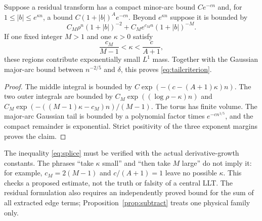 \begin{lemma}\label{lem:splice}
Suppose a residual transform has a compact minor-arc bound $Ce^{-cn}$ and, for $1\le|b|\le e^{\kappa n}$, a bound $C(1+|b|)^A e^{-cn}$. Beyond $e^{\kappa n}$ suppose it is bounded by
\[
 C_M\rho^n(1+|b|)^{-2}+C_Me^{c_M n}(1+|b|)^{-M}.
\]
If one fixed integer $M>1$ and one $\kappa>0$ satisfy
\begin{equation}\label{eq:splice}
       \frac{c_M}{M-1}<\kappa<\frac{c}{A+1},
\end{equation}
these regions contribute exponentially small $L^1$ mass. Together with the Gaussian major-arc bound between $n^{-2/5}$ and $\delta$, this proves \eqref{eq:tailcriterion}.
\end{lemma}
\begin{proof}
The middle integral is bounded by $C\exp(-(c-(A+1)\kappa)n)$. The two outer integrals are bounded by $C_M\exp((\log\rho-\kappa)n)$ and $C_M\exp(-( (M-1)\kappa-c_M)n)/(M-1)$. The torus has finite volume. The major-arc Gaussian tail is bounded by a polynomial factor times $e^{-c n^{1/5}}$, and the compact remainder is exponential. Strict positivity of the three exponent margins proves the claim.
\end{proof}
The inequality \eqref{eq:splice} must be verified with the actual derivative-growth constants. The phrases ``take $\kappa$ small'' and ``then take $M$ large'' do not imply it: for example, $c_M=2(M-1)$ and $c/(A+1)=1$ leave no possible $\kappa$. This checks a proposed estimate, not the truth or falsity of a central LLT. The residual formulation also requires an independently proved bound for the sum of all extracted edge terms; Proposition~\ref{prop:subtract} treats one physical family only.

